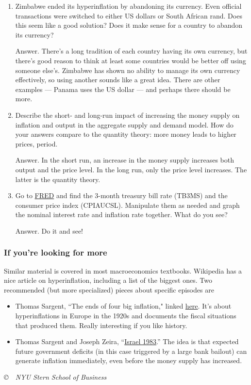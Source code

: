 \documentclass[letterpaper,12pt]{article}
\begin{document}
\begin{enumerate}
\item Zimbabwe ended its hyperinflation by abandoning its currency.  Even official transactions were switched to either US dollars or
    South African rand.
    Does this seem like a good solution?
    Does it make sense for a country to abandon its currency?

Answer.  There's a long tradition of each country having its own currency,
but there's good reason to think at least some countries would be better
off using someone else's.
Zimbabwe has shown no ability to manage its own currency effectively,
so using another sounds like a great idea.
There are other examples --- Panama uses the US dollar ---
and perhaps there should be more.

\item Describe the short- and long-run impact of increasing
the money supply on inflation and output in the aggregate supply
and demand model.
How do your answers compare to the quantity theory:
more money leads to higher prices, period.

Answer.
In the short run, an increase in the money supply increases
both output and the price level.
In the long run, only the price level increases.
The latter is the quantity theory.

\item Go to
\href{http://research.stlouisfed.org/fred2/}{FRED} and find
the 3-month treasury bill rate (TB3MS)
and the consumer price index (CPIAUCSL).
Manipulate them as needed and graph
the nominal interest rate and inflation rate together.
What do you see?

Answer.  Do it and see!

\end{enumerate}

\subsubsection*{If you're looking for more}

Similar material is covered in most macroeconomics textbooks.
Wikipedia has a nice article on hyperinflation,
including a list of the biggest ones.
Two recommended (but more specialized) pieces about specific
episodes are
%
\begin{itemize}
\item Thomas Sargent, ``The ends of four big inflation,"
linked
\href{http://www.nber.org/chapters/c11452.pdf}{here}.
It's about hyperinflations in Europe in the 1920s and documents
the fiscal situations that produced them.
Really interesting if you like history.

\item Thomas Sargent and Joseph Zeira,
``\href{http://homepages.nyu.edu/~ts43/research/zeira_sargent_final.pdf}
{Israel 1983}.''
The idea is that expected future government deficits
(in this case triggered by a large bank bailout)
can generate inflation immediately,
even before the money supply has increased.
\end{itemize}

\vfill \centerline{\it \copyright \ \number\year \ NYU Stern School of Business}
\end{document}
